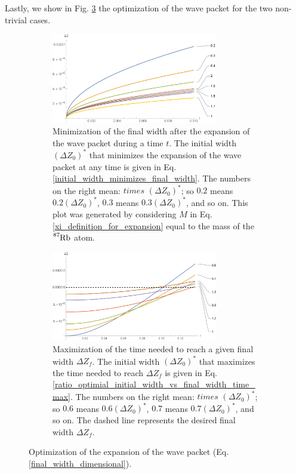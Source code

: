 \documentclass{article}
\begin{document}
Lastly, we show in Fig. \ref{optimization_expansion_width} the optimization of the wave packet for the two non-trivial cases.

\begin{figure}
    \centering
    \begin{subfigure}{1\textwidth}
        \centering
        \includegraphics[width=0.8\textwidth]{minimize_expansion_width.png}
        \caption{Minimization of the final width after the expansion of the wave packet during a time $t$. The initial width $(\Delta Z_{0})^{\ast}$ that minimizes the expansion of the wave packet at any time is given in Eq. \ref{initial_width_minimizes_final_width}. The numbers on the right mean: $times$ $(\Delta Z_{0})^{\ast}$; so $0.2$ means $0.2(\Delta Z_{0})^{\ast}$, $0.3$ means $0.3(\Delta Z_{0})^{\ast}$, and so on. This plot was generated by considering $M$ in Eq. \ref{xi_definition_for_expansion} equal to the mass of the $\ce{^{87}_{}Rb}$ atom.}
        \label{minimize_expansion_width}
    \end{subfigure}
    \hfill
    \begin{subfigure}{1\textwidth}
        \centering
        \includegraphics[width=0.8\textwidth]{maximize_expansion_time.png}
        \caption{Maximization of the time needed to reach a given final width  $\Delta Z_{f}$. The initial width $(\Delta Z_{0})^{\ast}$ that maximizes the time needed to reach $\Delta Z_{f}$ is given in Eq. \ref{ratio_optimial_initial_width_vs_final_width_time_max}. The numbers on the right mean: $times$ $(\Delta Z_{0})^{\ast}$; so $0.6$ means $0.6(\Delta Z_{0})^{\ast}$, $0.7$ means $0.7(\Delta Z_{0})^{\ast}$, and so on. The dashed line represents the desired final width $\Delta Z_{f}$.}
        \label{maximize_expansion_time}
    \end{subfigure}
    \caption{Optimization of the expansion of the wave packet (Eq. \ref{final_width_dimensional}).}
    \label{optimization_expansion_width}
\end{figure}
\end{document}
